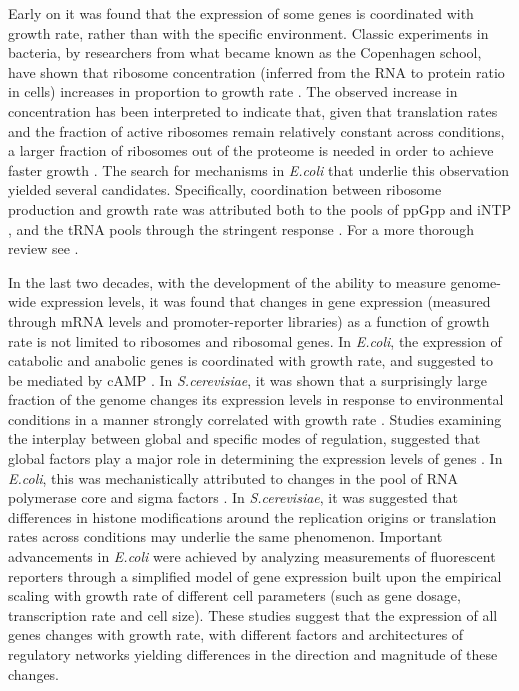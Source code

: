 \documentclass[a4paper]{article}
\begin{document}
Early on it was found that the expression of some genes is coordinated with growth rate, rather than with the specific environment.
Classic experiments in bacteria, by researchers from what became known as the Copenhagen school, have shown that ribosome concentration (inferred from the RNA to protein ratio in cells) increases in proportion to growth rate \cite{Schaechter1958}.
The observed increase in concentration has been interpreted to indicate that, given that translation rates and the fraction of active ribosomes remain relatively constant across conditions, a larger fraction of ribosomes out of the proteome is needed in order to achieve faster growth \cite{Neidhardt1999,Dennis2004,Zaslaver2009}. The search for mechanisms in \emph{E.coli} that underlie this observation yielded several candidates.
Specifically, coordination between ribosome production and growth rate was attributed both to the pools of ppGpp and iNTP \cite{Murray_2003}, and the tRNA pools through the stringent response \cite{Chatterji2001,Brauer2008a}.
For a more thorough review see \cite{Nomura1984}.

In the last two decades, with the development of the ability to measure genome-wide expression levels, it was found that changes in gene expression (measured through mRNA levels and promoter-reporter libraries) as a function of growth rate is not limited to ribosomes and ribosomal genes.
In \emph{E.coli}, the expression of catabolic and anabolic genes is coordinated with growth rate, and suggested to be mediated by cAMP \cite{Saldanha2004}.
In \emph{S.cerevisiae}, it was shown that a surprisingly large fraction of the genome changes its expression levels in response to environmental conditions in a manner strongly correlated with growth rate \cite{Keren2013a,Brauer2008,Castrillo2007,Gerosa2013}.
Studies examining the interplay between global and specific modes of regulation, suggested that global factors play a major role in determining the expression levels of genes \cite{Gasch2000,Klumpp2009a,Scott2010,Berthoumieux2013,Keren2013a,Gerosa2013,Valgepea2013,Hui_2015}.
In \emph{E.coli}, this was mechanistically attributed to changes in the pool of RNA polymerase core and sigma factors \cite{Klumpp2008}.
In \emph{S.cerevisiae}, it was suggested that differences in histone modifications around the replication origins \cite{Regenberg2006} or translation rates \cite{Brauer2008} across conditions may underlie the same phenomenon.
Important advancements in \emph{E.coli} were achieved by analyzing measurements of fluorescent reporters through a simplified model of gene expression built upon the empirical scaling with growth rate of different cell parameters (such as gene dosage, transcription rate and cell size)\cite{Klumpp2009a}.
These studies suggest that the expression of all genes changes with growth rate, with different factors and architectures of regulatory networks yielding differences in the direction and magnitude of these changes. 
\end{document}
